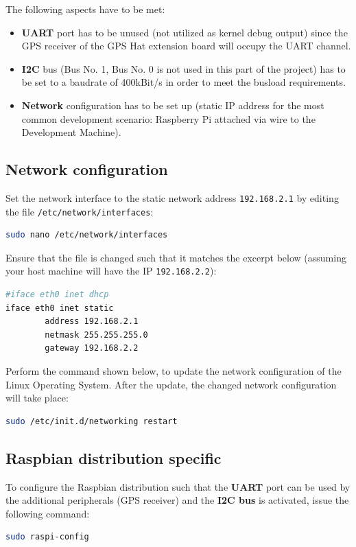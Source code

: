 The following aspects have to be met:
\begin{itemize}
	\item \textbf{UART} port has to be unused (not utilized as kernel debug output) since the GPS receiver of the GPS Hat extension board will occupy the UART channel.
	
	\item \textbf{I2C} bus (Bus No. 1, Bus No. 0 is not used in this part of the project) has to be set to a baudrate of 400kBit/s in order to meet the busload requirements.
	
	\item \textbf{Network} configuration has to be set up (static IP address for the most common development scenario: Raspberry Pi attached via wire to the Development Machine).
\end{itemize}

\subsection*{Network configuration}
Set the network interface to the static network address \texttt{192.168.2.1} by editing the file \texttt{/etc/network/interfaces}:
\begin{lstlisting}[language=bash,otherkeywords={make,scp,dd,sudo,nano}]
sudo nano /etc/network/interfaces
\end{lstlisting}
Ensure that the file is changed such that it matches the excerpt below (assuming your host machine will have the IP \texttt{192.168.2.2}):
\begin{lstlisting}[language=bash,otherkeywords={make,scp,sudo}]
#iface eth0 inet dhcp
iface eth0 inet static
        address 192.168.2.1
        netmask 255.255.255.0
        gateway 192.168.2.2
\end{lstlisting}

Perform the command shown below, to update the network configuration of the Linux Operating System. After the update, the changed network configuration will take place:
\begin{lstlisting}[language=bash,otherkeywords={make,scp,sudo}]
sudo /etc/init.d/networking restart
\end{lstlisting}


\subsection{Raspbian distribution specific}
\label{sec:OS:configProject:raspbian}
To configure the Raspbian distribution such that the \textbf{UART} port can be used by the additional peripherals (GPS receiver) and the \textbf{I2C bus} is activated, issue the following command:
\begin{lstlisting}[language=bash,otherkeywords={make,scp,dd,sudo}]
sudo raspi-config
\end{lstlisting}

